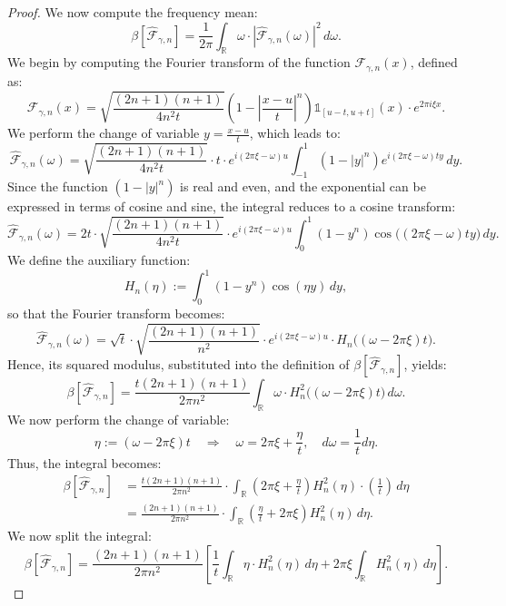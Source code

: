 \documentclass[preprint,hidelinks,authoryear]{elsarticle}
\theoremstyle{plain}
\theoremstyle{definition}
\theoremstyle{remark}
\begin{document}
\begin{proof}
We now compute the frequency mean:
$$
\beta[\hat{\mathcal{F}}_{\gamma,n}] = \frac{1}{2\pi} \int_{\mathbb{R}} \omega \cdot |\hat{\mathcal{F}}_{\gamma,n}(\omega)|^2 \, d\omega.
$$
We begin by computing the Fourier transform of the function $ \mathcal{F}_{\gamma,n}(x) $, defined as:
$$
\mathcal{F}_{\gamma,n}(x) = \sqrt{\frac{(2n+1)(n+1)}{4n^2 t}} \left(1 - \left| \frac{x - u}{t} \right|^n \right) \mathds{1}_{[u - t, u + t]}(x) \cdot e^{2\pi i \xi x}.
$$
We perform the change of variable $ y = \frac{x - u}{t} $, which leads to:
$$
\hat{\mathcal{F}}_{\gamma,n}(\omega) = \sqrt{\frac{(2n+1)(n+1)}{4n^2 t}} \cdot t \cdot e^{i(2\pi \xi - \omega) u} \int_{-1}^{1} (1 - |y|^n) e^{i(2\pi \xi - \omega)t y} \, dy.
$$
Since the function $ (1 - |y|^n) $ is real and even, and the exponential can be expressed in terms of cosine and sine, the integral reduces to a cosine transform:
\begin{equation*}
\hat{\mathcal{F}}_{\gamma,n}(\omega) = 2t \cdot \sqrt{\frac{(2n+1)(n+1)}{4n^2 t}} \cdot e^{i(2\pi \xi - \omega) u} \int_{0}^{1} (1 - y^n) \cos\big((2\pi \xi - \omega)t y\big) \, dy.
\end{equation*}
We define the auxiliary function:
$$
H_n(\eta) := \int_0^1 (1 - y^n) \cos(\eta y) \, dy,
$$
so that the Fourier transform becomes:
\begin{equation}
\label{eq:Fnfourier}
\hat{\mathcal{F}}_{\gamma,n}(\omega) = \sqrt{t} \cdot \sqrt{\frac{(2n+1)(n+1)}{n^2}} \cdot e^{i(2\pi \xi - \omega) u} \cdot H_n\big((\omega-2\pi \xi)t\big).    
\end{equation}
Hence, its squared modulus, substituted into the definition of $ \beta[\hat{\mathcal{F}}_{\gamma,n}] $, yields:
$$
\beta[\hat{\mathcal{F}}_{\gamma,n}] = \frac{t(2n+1)(n+1)}{2\pi n^2} \int_{\mathbb{R}} \omega \cdot H_n^2\big((\omega-2\pi \xi)t\big) \, d\omega.
$$
We now perform the change of variable:
$$
\eta := (\omega-2\pi \xi)t \quad \Rightarrow \quad \omega = 2\pi \xi + \frac{\eta}{t}, \quad d\omega = \frac{1}{t} d\eta.
$$
Thus, the integral becomes:
$$
\begin{aligned}
\beta[\hat{\mathcal{F}}_{\gamma,n}]
&= \frac{t(2n+1)(n+1)}{2\pi n^2} \cdot \int_{\mathbb{R}} \left(2\pi \xi + \frac{\eta}{t} \right) H_n^2(\eta) \cdot \left(\frac{1}{t} \right) \, d\eta \\
&= \frac{(2n+1)(n+1)}{2\pi n^2} \cdot \int_{\mathbb{R}} \left( \frac{\eta}{t} +2\pi \xi \right) H_n^2(\eta) \, d\eta.
\end{aligned}
$$
We now split the integral:
$$
\beta[\hat{\mathcal{F}}_{\gamma,n}] = \frac{(2n+1)(n+1)}{2\pi n^2} \left[ \frac{1}{t} \int_{\mathbb{R}} \eta \cdot H_n^2(\eta) \, d\eta + 2\pi \xi \int_{\mathbb{R}} H_n^2(\eta) \, d\eta \right].
$$
\end{proof}
\end{document}
